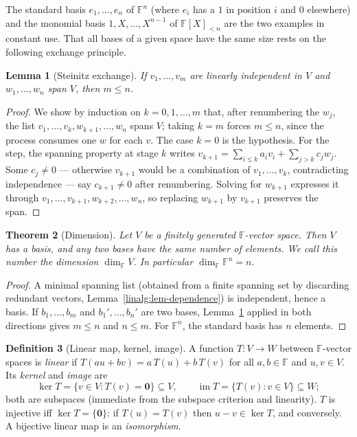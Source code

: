 \documentclass[11pt,a4paper]{article}
\newtheorem{theorem}{Theorem}[section]
\newtheorem{lemma}[theorem]{Lemma}
\theoremstyle{definition}
\newtheorem{definition}[theorem]{Definition}
\theoremstyle{remark}
\newcommand{\F}{\ensuremath{\mathbb{F}}}
\DeclareMathOperator{\img}{im}
\begin{document}
The standard basis \(e_1, \dots, e_n\) of \(\F^n\) (where \(e_i\) has a \(1\) in position \(i\) and \(0\) elsewhere) and the monomial basis \(1, X, \dots, X^{n-1}\) of \(\F[X]_{<n}\) are the two examples in constant use. That all bases of a given space have the same size rests on the following exchange principle.

\begin{lemma}[Steinitz exchange]\label{linalg:lem-exchange}
If \(v_1, \dots, v_m\) are linearly independent in \(V\) and \(w_1, \dots, w_n\) span \(V\), then \(m \le n\).
\end{lemma}

\begin{proof}
We show by induction on \(k = 0, 1, \dots, m\) that, after renumbering the \(w_j\), the list \(v_1, \dots, v_k, w_{k+1}, \dots, w_n\) spans \(V\); taking \(k = m\) forces \(m \le n\), since the process consumes one \(w\) for each \(v\). The case \(k=0\) is the hypothesis. For the step, the spanning property at stage \(k\) writes \(v_{k+1} = \sum_{i \le k} a_i v_i + \sum_{j > k} c_j w_j\). Some \(c_j \neq 0\) --- otherwise \(v_{k+1}\) would be a combination of \(v_1, \dots, v_k\), contradicting independence --- say \(c_{k+1} \neq 0\) after renumbering. Solving for \(w_{k+1}\) expresses it through \(v_1, \dots, v_{k+1}, w_{k+2}, \dots, w_n\), so replacing \(w_{k+1}\) by \(v_{k+1}\) preserves the span.
\end{proof}

\begin{theorem}[Dimension]\label{linalg:thm-dimension}
Let \(V\) be a finitely generated \(\F\)-vector space. Then \(V\) has a basis, and any two bases have the same number of elements. We call this number the \emph{dimension} \(\dim_\F V\). In particular \(\dim_\F \F^n = n\).
\end{theorem}

\begin{proof}
A minimal spanning list (obtained from a finite spanning set by discarding redundant vectors, Lemma~\ref{linalg:lem-dependence}) is independent, hence a basis. If \(b_1, \dots, b_m\) and \(b_1', \dots, b_n'\) are two bases, Lemma~\ref{linalg:lem-exchange} applied in both directions gives \(m \le n\) and \(n \le m\). For \(\F^n\), the standard basis has \(n\) elements.
\end{proof}

\begin{definition}[Linear map, kernel, image]\label{linalg:def-linear-map}
A function \(T \colon V \to W\) between \(\F\)-vector spaces is \emph{linear} if \(T(au + bv) = a\,T(u) + b\,T(v)\) for all \(a, b \in \F\) and \(u, v \in V\). Its \emph{kernel} and \emph{image} are
\[
\ker T = \{v \in V : T(v) = \mathbf 0\} \subseteq V, \qquad \img T = \{T(v) : v \in V\} \subseteq W ;
\]
both are subspaces (immediate from the subspace criterion and linearity). \(T\) is injective iff \(\ker T = \{\mathbf 0\}\): if \(T(u) = T(v)\) then \(u - v \in \ker T\), and conversely. A bijective linear map is an \emph{isomorphism}.
\end{definition}
\end{document}
